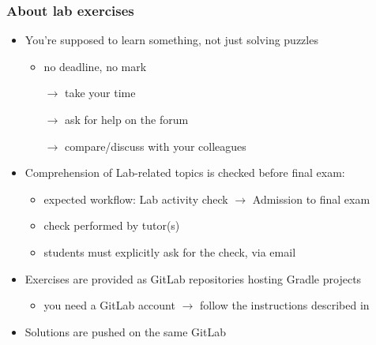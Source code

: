 \documentclass[handout]{beamer}\mode<presentation>{\usetheme{AMSCesenaPurpleAndGold}}
\begin{document}
\begin{frame}%
	\frametitle{About lab exercises}
	
	\begin{itemize}
		\item You're supposed to learn something, not just solving puzzles
		\begin{itemize}
			\item no deadline, no mark
			\item[$\rightarrow$] take your time
			\item[$\rightarrow$] ask for help on the forum
			\item[$\rightarrow$] compare/discuss with your colleagues
		\end{itemize}
	
		\vfill
		
		\item Comprehension of Lab-related topics is checked before final exam:
		\begin{itemize}
			\item \alert{expected workflow:} Lab activity check $\rightarrow$ Admission to final exam
			\item check performed by tutor(s)
			\item students must explicitly ask for the check, via email
		\end{itemize}
	
		\vfill
		
		\item Exercises are provided as GitLab repositories hosting Gradle projects
		\begin{itemize}
			\item you need a GitLab account $\rightarrow$ follow the instructions described in 
		\end{itemize}
	
		\vfill
		
		\item Solutions are pushed on the same GitLab 
		
	\end{itemize}
	
\end{frame}

\section*{}
\frame{\titlepage}
\end{document}
